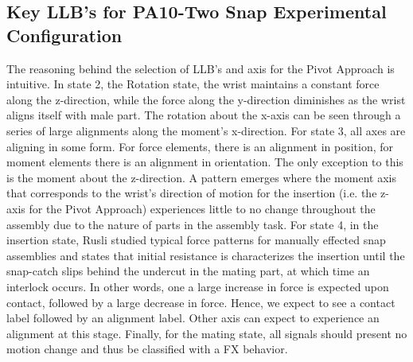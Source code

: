 \subsection{Key LLB's for PA10-Two Snap Experimental Configuration}
The reasoning behind the selection of LLB's and axis for the Pivot Approach is intuitive. In state 2, the Rotation state, the wrist maintains a constant force along the z-direction, while the force along the y-direction diminishes as the wrist aligns itself with male part. The rotation about the x-axis can be seen through a series of large alignments along the moment's x-direction. For state 3, all axes are aligning in some form. For force elements, there is an alignment in position, for moment elements there is an alignment in orientation. The only exception to this is the moment about the z-direction. A pattern emerges where the moment axis that corresponds to the wrist's direction of motion for the insertion (i.e. the z-axis for the Pivot Approach) experiences little to no change throughout the assembly due to the nature of parts in the assembly task. For state 4, in the insertion state, Rusli studied typical force patterns for manually effected snap assemblies and states that initial resistance is characterizes the insertion until the snap-catch slips behind the undercut in the mating part, at which time an interlock occurs. In other words, one a large increase in force is expected upon contact, followed by a large decrease in force. Hence, we expect to see a contact label followed by an alignment label. Other axis can expect to experience an alignment at this stage. Finally, for the mating state, all signals should present no motion change and thus be classified with a FX behavior.
